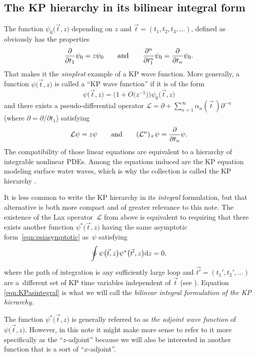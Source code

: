 \documentclass[pdftex]{sigma}
\numberwithin{equation}{section}
\theoremstyle{definition}
\def\vt{\vec{t}}
\def\vtp{\vec{t'}}
\begin{document}
\subsection{The KP hierarchy in its bilinear integral form}
The function $\psi_0\bigl(\vt,z\bigr)$ depending on $z$ and
$\vt=(t_1,t_2,t_3,\ldots)$, defined as
\smash{$
\psi_0\bigl(\vt,z\bigr)={\rm e}^{\sum t_i z^i}
$}
obviously has the properties
\[
\frac{\partial}{\partial t_1}\psi_0=z\psi_0\qquad\hbox{and}\qquad
\frac{\partial^n}{\partial t_1^n}\psi_0=\frac{\partial}{\partial
 t_n}\psi_0.
\]
That makes it the \textit{simplest} example of a KP wave function.
More generally, a function $\psi\bigl(\vt,z\bigr)$
is called a ``KP wave function'' if it is of the form
\begin{equation}
\psi\bigl(\vt,z\bigr)=\bigl(1+O\bigl(z^{-1}\bigr)\bigr)\psi_0\bigl(\vt,z\bigr)\label{eqn:psiasymptotic}
\end{equation}
and there exists a pseudo-differential operator
$\mathcal{L}=\partial+\sum_{n=1}^{\infty}\alpha_n(\vt\,)\partial^{-n}$
(where $\partial=\partial/\partial t_1$) satisfying
\[
\mathcal{L}\psi=z\psi\qquad\hbox{and}\qquad(\mathcal{L}^n)_+\psi=\frac{\partial}{\partial
t_n}\psi.
\]
The
compatibility of those linear equations are equivalent to a hierarchy of integrable nonlinear PDEs.
Among the equations induced are the KP equation modeling surface water
waves, which is why the collection is called the KP hierarchy \cite{GOST,Sato,SegalWilson}.

It is less common to write the KP
hierarchy in its \textit{integral} formulation, but that alternative
is both more compact and of greater relevance to this note. The
existence of the Lax operator~$\mathcal{L}$ from above is equivalent
to requiring that
there exists another function $\psi^*\bigl(\vt,z\bigr)$ having the same
asymptotic form~\eqref{eqn:psiasymptotic} as~$\psi$
satisfying
\begin{equation}
\oint \psi\bigl(\vt,z\bigr)\psi^*\bigl(\vtp,z\bigr){\rm d}z=0,\label{eqn:KPasintegral}
\end{equation}
where the path of integration is any sufficiently large loop and
 $\vtp=(t_1',t_2',\ldots)$ are a~different set of KP time variables
 independent of $\vt$
 (see \cite{DateJimboKashMiwaI,DateJimboKashMiwaIII,DateJimboKashMiwaIV,DateJimboKashMiwaV,DateJimboKashMiwaVI,DateJimboKashMiwaVII}). Equation \eqref{eqn:KPasintegral} is what we will call the
\textit{bilinear integral formulation of the KP hierarchy}.


The function
$\psi^*\bigl(\vt,z\bigr)$ is generally referred to as \textit{the adjoint wave
 function} of $\psi\bigl(\vt,z\bigr)$. However, in this note it might make
more sense to refer to it more specifically as the ``$z$-adjoint'' because
we will also be interested in another function that is a sort of
``$x$-adjoint''.
\end{document}
